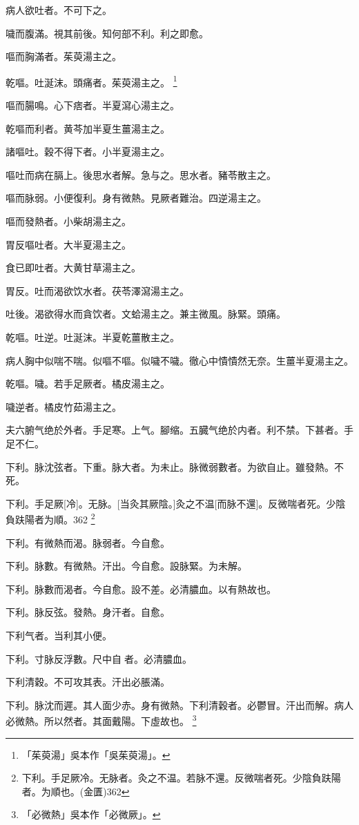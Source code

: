 \documentclass[11pt,oneside,b5paper]{ctexbook}
\begin{document}
\begin{flushleft}
病人欲吐者。不可下之。

噦而腹滿。視其前後。知何部不利。利之即愈。

嘔而胸滿者。茱萸湯主之。

乾嘔。吐涎沫。頭痛者。茱萸湯主之。
\footnote{「茱萸湯」吳本作「吳茱萸湯」。}

嘔而腸鳴。心下痞者。半夏瀉心湯主之。

乾嘔而利者。黄芩加半夏生薑湯主之。

諸嘔吐。穀不得下者。小半夏湯主之。

嘔吐而病在膈上。後思水者解。急与之。思水者。豬苓散主之。

嘔而脉弱。小便復利。身有微熱。見厥者難治。四逆湯主之。

嘔而發熱者。小柴胡湯主之。

胃反嘔吐者。大半夏湯主之。

食已即吐者。大黄甘草湯主之。

胃反。吐而渴欲饮水者。茯苓澤瀉湯主之。

吐後。渴欲得水而貪饮者。文蛤湯主之。兼主微風。脉緊。頭痛。

乾嘔。吐逆。吐涎沫。半夏乾薑散主之。

病人胸中似喘不喘。似嘔不嘔。似噦不噦。徹心中憒憒然无奈。生薑半夏湯主之。

乾嘔。噦。若手足厥者。橘皮湯主之。

噦逆者。橘皮竹茹湯主之。

夫六腑气绝於外者。手足寒。上气。腳缩。五臓气绝於内者。利不禁。下甚者。手足不仁。

下利。脉沈弦者。下重。脉大者。为未止。脉微弱數者。为欲自止。雖發熱。不死。

下利。手足厥[冷]。无脉。[当灸其厥陰。]灸之不温[而脉不還]。反微喘者死。少陰負趺陽者为順。362
\footnote{下利。手足厥冷。无脉者。灸之不温。若脉不還。反微喘者死。少陰負趺陽者。为順也。(金匱)362}

下利。有微熱而渴。脉弱者。今自愈。

下利。脉數。有微熱。汗出。今自愈。設脉緊。为未解。

下利。脉數而渴者。今自愈。設不差。必清膿血。以有熱故也。

下利。脉反弦。發熱。身汗者。自愈。

下利气者。当利其小便。

下利。寸脉反浮數。尺中自{𬈧}者。必清膿血。

下利清穀。不可攻其表。汗出必脹滿。

下利。脉沈而遲。其人面少赤。身有微熱。下利清穀者。必鬱冒。汗出而解。病人必微熱。所以然者。其面戴陽。下虛故也。
\footnote{「必微熱」吳本作「必微厥」。}


\end{flushleft}
\end{document}
